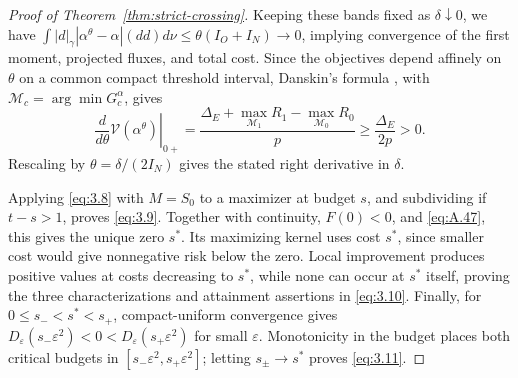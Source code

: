 \begin{proof}[Proof of Theorem~\ref{thm:strict-crossing}]
Keeping these bands fixed as \(\delta\downarrow0\), we have \(\int|d|_\gamma|\alpha^\theta-\alpha|(dd)d\nu\le\theta(I_O+I_N)\to0\), implying convergence of the first moment, projected fluxes, and total cost. Since the objectives depend affinely on \(\theta\) on a common compact threshold interval, Danskin's formula \cite[Proposition~A.3.2(a)]{bertsekas2009}, with \(\mathcal M_c=\arg\min G_c^\alpha\), gives
\begin{equation}
\left.\frac d{d\theta}\mathcal V(\alpha^\theta)\right|_{0+}
=\frac{\Delta_E+\max_{\mathcal M_1}R_1-\max_{\mathcal M_0}R_0}{p}\ge\frac{\Delta_E}{2p}>0. \tag{A.51}\label{eq:A.51}
\end{equation}
Rescaling by \(\theta=\delta/(2I_N)\) gives the stated right derivative in \(\delta\).

Applying \eqref{eq:3.8} with \(M=S_0\) to a maximizer at budget \(s\), and subdividing if \(t-s>1\), proves \eqref{eq:3.9}. Together with continuity, \(F(0)<0\), and \eqref{eq:A.47}, this gives the unique zero \(s^*\). Its maximizing kernel uses cost \(s^*\), since smaller cost would give nonnegative risk below the zero. Local improvement produces positive values at costs decreasing to \(s^*\), while none can occur at \(s^*\) itself, proving the three characterizations and attainment assertions in \eqref{eq:3.10}. Finally, for \(0\le s_-<s^*<s_+\), compact-uniform convergence gives \(D_\varepsilon(s_-\varepsilon^2)<0<D_\varepsilon(s_+\varepsilon^2)\) for small \(\varepsilon\). Monotonicity in the budget places both critical budgets in \([s_-\varepsilon^2,s_+\varepsilon^2]\); letting \(s_\pm\to s^*\) proves \eqref{eq:3.11}.
\end{proof}
